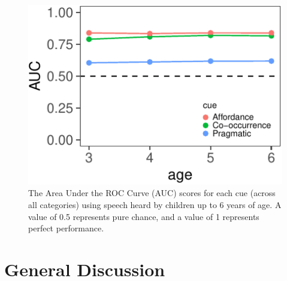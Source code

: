\documentclass[10pt, letterpaper]{article}
\newenvironment{CodeChunk}{}{}
\begin{document}
\begin{CodeChunk}
\begin{figure}[h]

{\centering \includegraphics{cogsci_files/figure-latex/dev-1} 

}

\caption{\label{fig:dev}The Area Under the ROC Curve (AUC) scores for each cue (across all categories) using speech heard by children up to 6 years of age. A value of 0.5 represents pure chance, and a value of 1 represents perfect performance. }\label{fig:dev}
\end{figure}
\end{CodeChunk}

\hypertarget{general-discussion}{%
\section{General Discussion}\label{general-discussion}}
\end{document}
